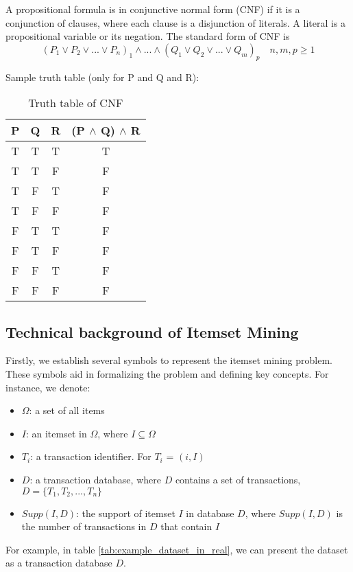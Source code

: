 A propositional formula is in conjunctive normal form (CNF) if it is a conjunction of clauses, where each clause is a disjunction of literals. A literal is a propositional variable or its negation.
The standard form of CNF is
\begin{equation*}
    (P_1 \lor P_2 \lor ... \lor P_n)_1 \land ... \land (Q_1 \lor Q_2 \lor ... \lor Q_m)_p \quad n,m,p \geq 1
\end{equation*}

Sample truth table (only for P and Q and R):
\begin{table}[H]
    \centering
    \caption{Truth table of CNF}
    \label{tab:truth_table_cnf}
    \begin{tabular}{|c|c|c|c|}
        \hline
        P & Q & R & (P $\land$ Q) $\land$ R \\
        \hline
        T & T & T & T                       \\
        T & T & F & F                       \\
        T & F & T & F                       \\
        T & F & F & F                       \\
        F & T & T & F                       \\
        F & T & F & F                       \\
        F & F & T & F                       \\
        F & F & F & F                       \\
        \hline
    \end{tabular}
\end{table}

\subsection{Technical background of Itemset Mining}
Firstly, we establish several symbols to represent the itemset mining problem.
These symbols aid in formalizing the problem and defining key concepts.
For instance, we denote:
\begin{itemize}
    \item \textbf{$\Omega$}: a set of all items
    \item \textbf{$I$}: an itemset in $\Omega$, where $I \subseteq \Omega$
    \item \textbf{$T_i$}: a transaction identifier. For $T_i$ = $(i,I)$
    \item \textbf{$D$}: a transaction database, where $D$ contains a set of transactions, $D = \{T_1, T_2, ..., T_n\}$
    \item \textbf{$Supp(I, D)$}: the support of itemset $I$ in database $D$, where $Supp(I, D)$ is the number of transactions in $D$ that contain $I$
\end{itemize}
For example, in table \ref{tab:example_dataset_in_real},
we can present the dataset as a transaction database $D$.

